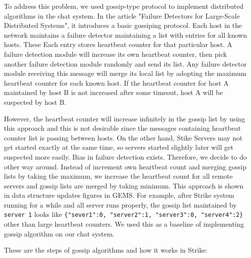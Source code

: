 \documentclass[dareport.tex]{subfiles}
\begin{document}
To address this problem, we used gossip-type protocol to implement distributed algorithms in the chat system. In the article "Failure Detectors for Large-Scale Distributed Systems"\cite{failuredetector}, it introduces a basic gossiping protocol. Each host in the network maintains a failure detector maintaining a list with entries for all known hosts. These Each entry stores heartbeat counter for that particular host. A failure detection module will increase its own heartbeat counter, then pick another failure detection module randomly and send its list. Any failure detector module receiving this message will merge its local list by adopting the maximum heartbeat counter for each known host. If the heartbeat counter for host A  maintained by host B is not increased after some timeout, host A will be suspected by host B. 

However, the heartbeat counter will increase infinitely in the gossip list by using this approach and this is not desirable since the messages containing heartbeat counter list is passing between hosts. On the other hand, Stike Servers may not get started exactly at the same time, so servers started slightly later will get suspected more easily. Bias in failure detection exists. Therefore, we decide to do other way around. Instead of increment own heartbeat count and merging gossip lists by taking the maximum, we increase the heartbeat count for all remote servers and gossip lists are merged by taking minimum. This approach is shown in data structure updates figures in GEMS\cite{gems}. For example, after Strike system running for a while and all server runs properly, the gossip list maintained by \verb|server 1| looks like \verb|{"sever1":0, "server2":1, "server3":0, "server4":2}| other than large heartbeat counters. We used this as a baseline of implementing gossip algorithm on our chat system. 

These are the steps of gossip algorithms and how it works in Strike:
\end{document}

